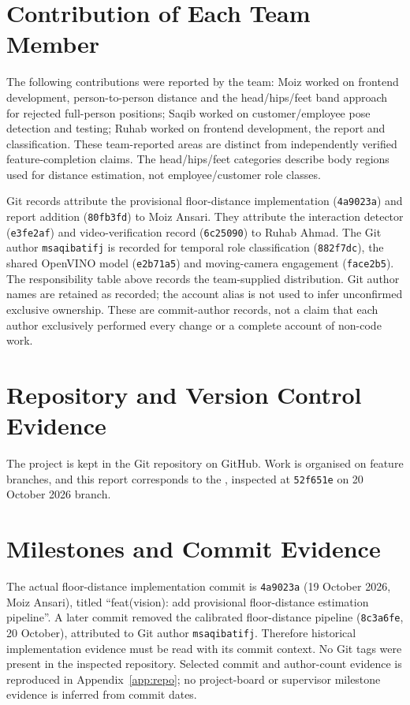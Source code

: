 \section{Contribution of Each Team Member}
The following contributions were reported by the team: Moiz worked on frontend development, person-to-person distance and the head/hips/feet band approach for rejected full-person positions; Saqib worked on customer/employee pose detection and testing; Ruhab worked on frontend development, the report and classification. These team-reported areas are distinct from independently verified feature-completion claims. The head/hips/feet categories describe body regions used for distance estimation, not employee/customer role classes.

Git records attribute the provisional floor-distance implementation (\texttt{4a9023a}) and report addition (\texttt{80fb3fd}) to Moiz Ansari. They attribute the interaction detector (\texttt{e3fe2af}) and video-verification record (\texttt{6c25090}) to Ruhab Ahmad. The Git author \texttt{msaqibatifj} is recorded for temporal role classification (\texttt{882f7dc}), the shared OpenVINO model (\texttt{e2b71a5}) and moving-camera engagement (\texttt{face2b5}). The responsibility table above records the team-supplied distribution. Git author names are retained as recorded; the account alias is not used to infer unconfirmed exclusive ownership. These are commit-author records, not a claim that each author exclusively performed every change or a complete account of non-code work.

\section{Repository and Version Control Evidence}
The project is kept in the Git repository  on GitHub. Work is organised on feature branches, and this report corresponds to the , inspected at \texttt{52f651e} on 20 October 2026 branch.

\section{Milestones and Commit Evidence}
The actual floor-distance implementation commit is \texttt{4a9023a} (19 October 2026, Moiz Ansari), titled ``feat(vision): add provisional floor-distance estimation pipeline''. A later commit removed the calibrated floor-distance pipeline (\texttt{8c3a6fe}, 20 October), attributed to Git author \texttt{msaqibatifj}. Therefore historical implementation evidence must be read with its commit context. No Git tags were present in the inspected repository. Selected commit and author-count evidence is reproduced in Appendix~\ref{app:repo}; no project-board or supervisor milestone evidence is inferred from commit dates.

